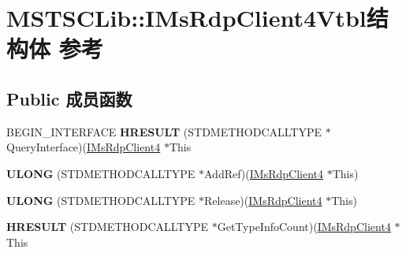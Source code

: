 \hypertarget{struct_m_s_t_s_c_lib_1_1_i_ms_rdp_client4_vtbl}{}\section{M\+S\+T\+S\+C\+Lib\+:\+:I\+Ms\+Rdp\+Client4\+Vtbl结构体 参考}
\label{struct_m_s_t_s_c_lib_1_1_i_ms_rdp_client4_vtbl}
\subsection*{Public 成员函数}
\begin{DoxyCompactItemize}
\item 
\mbox{\label{struct_m_s_t_s_c_lib_1_1_i_ms_rdp_client4_vtbl_a8742c5aeb9b036ffbd9a523660a97a25}} 
B\+E\+G\+I\+N\+\_\+\+I\+N\+T\+E\+R\+F\+A\+CE {\bfseries H\+R\+E\+S\+U\+LT} (S\+T\+D\+M\+E\+T\+H\+O\+D\+C\+A\+L\+L\+T\+Y\+PE $\ast$Query\+Interface)(\hyperlink{interface_m_s_t_s_c_lib_1_1_i_ms_rdp_client4}{I\+Ms\+Rdp\+Client4} $\ast$This
\item 
\mbox{\label{struct_m_s_t_s_c_lib_1_1_i_ms_rdp_client4_vtbl_a6849a2b0204e73a521e803faef8508e3}} 
{\bfseries U\+L\+O\+NG} (S\+T\+D\+M\+E\+T\+H\+O\+D\+C\+A\+L\+L\+T\+Y\+PE $\ast$Add\+Ref)(\hyperlink{interface_m_s_t_s_c_lib_1_1_i_ms_rdp_client4}{I\+Ms\+Rdp\+Client4} $\ast$This)
\item 
\mbox{\label{struct_m_s_t_s_c_lib_1_1_i_ms_rdp_client4_vtbl_a65c0ff0fa3899a71166e3d8889437159}} 
{\bfseries U\+L\+O\+NG} (S\+T\+D\+M\+E\+T\+H\+O\+D\+C\+A\+L\+L\+T\+Y\+PE $\ast$Release)(\hyperlink{interface_m_s_t_s_c_lib_1_1_i_ms_rdp_client4}{I\+Ms\+Rdp\+Client4} $\ast$This)
\item 
\mbox{\label{struct_m_s_t_s_c_lib_1_1_i_ms_rdp_client4_vtbl_acd9694da00f796c128a36267b44f47e6}} 
{\bfseries H\+R\+E\+S\+U\+LT} (S\+T\+D\+M\+E\+T\+H\+O\+D\+C\+A\+L\+L\+T\+Y\+PE $\ast$Get\+Type\+Info\+Count)(\hyperlink{interface_m_s_t_s_c_lib_1_1_i_ms_rdp_client4}{I\+Ms\+Rdp\+Client4} $\ast$This
\item 
\mbox{\label{struct_m_s_t_s_c_lib_1_1_i_ms_rdp_client4_vtbl_a31df23f23a9e004e00579f219a2f3407}} 

\end{DoxyCompactItemize}

